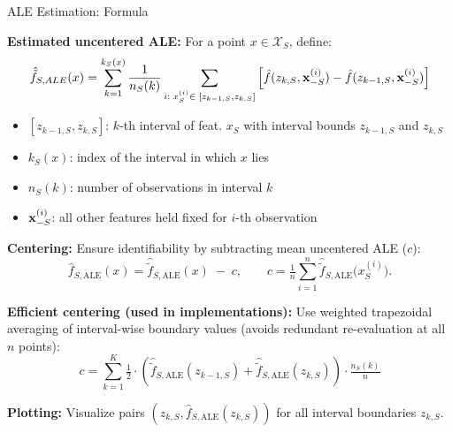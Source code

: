 \documentclass[10pt,compress,t,notes=noshow, xcolor=table]{beamer}
\begin{document}
\begin{frame}{ALE Estimation: Formula}

\textbf{Estimated uncentered ALE:}  
For a point $x \in \mathcal{X}_S$, define:
\[
\hat{\tilde{f}}_{S, ALE}(x) = \sum_{k = 1}^{k_S(x)}\frac{1}{n_S(k)}\sum_{i: \; x_S^{(i)} \in \; [z_{k-1, S}, z_{k, S}]}\left[\hat{f}(z_{k, S}, \mathbf{x}^{(i)}_{-S}) -\hat{f}(z_{k-1, S}, \mathbf{x}^{(i)}_{-S})\right]
\]

\begin{itemize}
\tightlist
  \item $[z_{k-1, S}, z_{k,S}]$: $k$-th interval of feat. $x_S$ with interval bounds $z_{k-1, S}$ and $z_{k,S}$ 
  \item $k_S(x)$: index of the interval in which $x$ lies
  \item $n_S(k)$: number of observations in interval $k$
  \item $\mathbf{x}_{-S}^{(i)}$: all other features held fixed for $i$-th observation
\end{itemize}

\pause
\medskip
\textbf{Centering:}  
Ensure identifiability by subtracting mean uncentered ALE ($c$):
\[
\hat f_{S,\text{ALE}}(x)=
\hat{\tilde f}_{S,\text{ALE}}(x)\;-\;c,
\qquad
c=\tfrac{1}{n}\textstyle\sum_{i=1}^{n}\hat{\tilde f}_{S,\text{ALE}}\bigl(x_S^{(i)}\bigr).
\]

\textbf{Efficient centering (used in implementations):}
Use weighted trapezoidal averaging of interval-wise boundary values (avoids redundant re-evaluation at all $n$ points):
\[
c =
\textstyle\sum_{k = 1}^{K} 
\tfrac{1
}{2} \cdot \left( 
\hat{\tilde{f}}_{S, \text{ALE}}(z_{k-1,S}) +
\hat{\tilde{f}}_{S, \text{ALE}}(z_{k,S}) \right) \cdot \tfrac{n_S(k)}{n} 
\]

\textbf{Plotting:} Visualize pairs $\left( z_{k,S}, \hat{f}_{S, \text{ALE}}(z_{k,S}) \right)$ for all interval boundaries $z_{k,S}$.
\end{frame}




\end{document}
